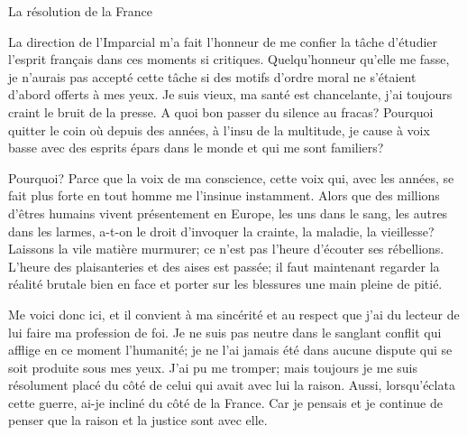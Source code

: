 
\begin{chapter}{La résolution de la France}

La direction de l'Imparcial m'a fait l'honneur de me confier la tâche
d'étudier l'esprit français dans ces moments si critiques.
Quelqu'honneur qu'elle me fasse, je n'aurais pas accepté cette tâche si
des motifs d'ordre moral ne s'étaient d'abord offerts à mes yeux. Je
suis vieux, ma santé est chancelante, j'ai toujours craint le bruit de
la presse. A quoi bon passer du silence au fracas? Pourquoi quitter le
coin où depuis des années, à l'insu de la multitude, je cause à voix
basse avec des esprits épars dans le monde et qui me sont familiers?

Pourquoi? Parce que la voix de ma conscience, cette voix qui, avec les
années, se fait plus forte en tout homme me l'insinue instamment. Alors
que des millions d'êtres humains vivent présentement en Europe, les uns
dans le sang, les autres dans les larmes, a-t-on le droit d'invoquer la
crainte, la maladie, la vieillesse? Laissons la vile matière murmurer;
ce n'est pas l'heure d'écouter ses rébellions. L'heure des plaisanteries
et des aises est passée; il faut maintenant regarder la réalité brutale
bien en face et porter sur les blessures une main pleine de pitié.

\horizontalLine

Me voici donc ici, et il convient à ma sincérité et au respect que j'ai
du lecteur de lui faire ma profession de foi. Je ne suis pas neutre dans
le sanglant conflit qui afflige en ce moment l'humanité; je ne l'ai
jamais été dans aucune dispute qui se soit produite sous mes yeux. J'ai
pu me tromper; mais toujours je me suis résolument placé du côté de
celui qui avait avec lui la raison. Aussi, lorsqu'éclata cette guerre,
ai-je incliné du côté de la France. Car je pensais et je continue de
penser que la raison et la justice sont avec elle.


\end{chapter}
